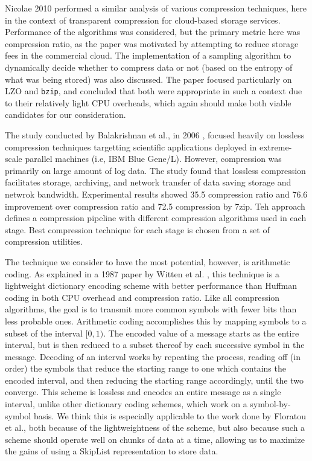\documentclass[twocolumn]{article}
\begin{document}
Nicolae 2010 \cite{ref:cloud-comp} performed a similar analysis of various
compression techniques, here in the context of transparent compression
for cloud-based storage services.  Performance of the algorithms
was considered, but the primary metric here was compression ratio, as the
paper was motivated by attempting to reduce storage fees in the commercial
cloud.  The implementation of a sampling algorithm to dynamically decide whether
to compress data or not (based on the entropy of what was being stored) was also
discussed.  The paper focused particularly on LZO and \verb+bzip+,
and concluded that both were appropriate in such a context due to their
relatively light CPU overheads, which again should make both viable candidates
for our consideration.

The study conducted by Balakrishnan et al., in 2006 \cite{ref:lossless-cluster},
focused heavily on lossless compression techniques targetting scientific applications
deployed in extreme-scale parallel machines (i.e, IBM Blue Gene/L). However, 
compression was primarily on large amount of log data. The study found that lossless
compression facilitates storage, archiving, and network transfer of data saving 
storage and netwrok bandwidth. Experimental results showed 35.5%
compression ratio and 76.6%
improvement over compression ratio and 72.5%
compression by 7zip. Teh approach defines a compression pipeline with different 
compression algorithms used in each stage. Best compression technique for each 
stage is chosen from a set of compression utilities.

The technique we consider to have the most potential, however, is arithmetic
coding.  As explained in a 1987 paper by Witten et al. \cite{ref:arith}, this
technique is a lightweight dictionary encoding scheme with better performance
than Huffman coding \cite{ref:huffman} in both CPU overhead and compression ratio. 
Like all compression algorithms, the goal is to transmit more common symbols
with fewer bits than less probable ones.  Arithmetic coding accomplishes
this by mapping symbols to a subset of the interval $ [0, 1) $.  The encoded
value of a message starts as the entire interval, but is then
reduced to a subset thereof by each successive symbol in the message.
Decoding of an interval works by repeating the process, reading off (in order)
the symbols that reduce the starting range to one which contains the encoded
interval, and then reducing the starting range accordingly, until the two
converge.  This scheme is lossless and encodes an entire message as a single
interval, unlike other dictionary coding schemes, which work on a
symbol-by-symbol basis.  We think this is especially applicable to the
work done by Floratou et al., both because of the lightweightness of the
scheme, but also because such a scheme should operate well on chunks of data
at a time, allowing us to maximize the gains of using a SkipList representation
to store data.
\end{document}
